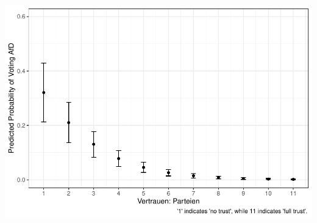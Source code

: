 \documentclass[
]{article}
\begin{document}
\includegraphics{AVCD_Final_Assignment-Edenhofer_files/figure-latex/afd-trust-parties-1.pdf}
\end{document}
